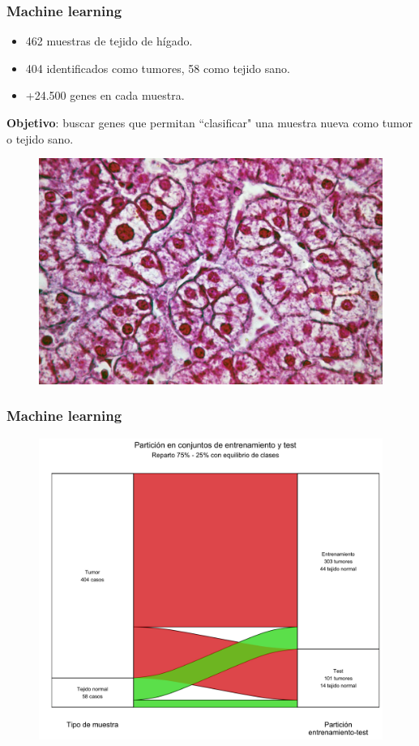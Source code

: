 \documentclass{beamer}
\begin{document}

\begin{frame}\frametitle{Machine learning}
	\begin{itemize}
		\item 462 muestras de tejido de hígado.
		\item 404 identificados como tumores, 58 como tejido sano.
		\item +24.500 genes en cada muestra.
	\end{itemize}
	\textbf{Objetivo}: buscar genes que permitan ``clasificar" una muestra nueva como tumor o tejido sano.
	\begin{figure}
		\centering
		\includegraphics[width=.65\textwidth]{images/liver.jpg}
	\end{figure}
\end{frame}


\begin{frame}\frametitle{Machine learning}
	\begin{figure}
		\centering
		\includegraphics[width=.75\textwidth]{images/07_higado_biclase_sankey.png}
	\end{figure}
\end{frame}
\end{document}
